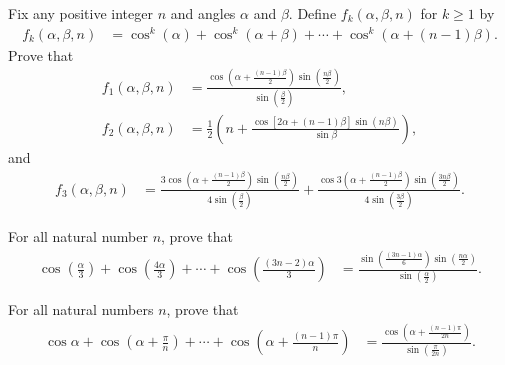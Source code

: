 \begin{tcolorbox}[title={Sum of Powers of Cosine of Angles Forming an AP}]
    \begin{question}
        Fix any positive integer $n$ and angles $\alpha$ and $\beta$. Define $f_k(\alpha,\beta, n)$ for $k\geq 1$ by
        \begin{align*}
            f_k(\alpha, \beta, n) &= \cos^k(\alpha) + \cos^k(\alpha+\beta) + \cdots + \cos^k(\alpha+(n-1)\beta).
        \end{align*}
        Prove that
        \begin{align*}
            f_1(\alpha, \beta, n) &= \frac{\displaystyle\cos\left(\alpha+\frac{(n-1)\beta}{2}\right)\sin\left(\frac{n\beta}{2}\right)}{\displaystyle\sin\left(\frac{\beta}{2}\right)},\\
            f_2(\alpha, \beta, n) &= \frac{1}{2}\left(n + \frac{\cos[2\alpha+(n-1)\beta]\sin(n\beta)}{\sin \beta}\right),
        \end{align*}
        and
        \begin{align*}
            f_3(\alpha, \beta, n) &= \frac{\displaystyle 3\cos\left(\alpha+\frac{(n-1)\beta}{2}\right)\sin\left(\frac{n\beta}{2}\right)}{\displaystyle 4\sin\left(\frac{\beta}{2}\right)}+\frac{\displaystyle \cos 3\left(\alpha+\frac{(n-1)\beta}{2}\right)\sin\left(\frac{3n\beta}{2}\right)}{\displaystyle 4\sin\left(\frac{3\beta}{2}\right)}.
        \end{align*}
    \end{question}
\end{tcolorbox}



\begin{question}
For all natural number $n$, prove that
    \begin{align*}
        \cos\left(\frac{\alpha}{3}\right) + \cos\left(\frac{4\alpha}{3}\right)  + \cdots + \cos\left(\frac{(3n-2)\alpha}{3}\right) &= \frac{\displaystyle\sin\left(\frac{(3n-1)\alpha}{6}\right)\sin\left(\frac{n\alpha}{2}\right)}{\displaystyle\sin\left(\frac{\alpha}{2}\right)}.
    \end{align*}
\end{question}


\begin{question}
For all natural numbers $n$, prove that
\begin{align*}
        \cos \alpha + \cos\left(\alpha+\frac{\pi}{n}\right)   + \cdots + \cos\left(\alpha+\frac{(n-1)\pi}{n}\right) &=      \frac{\displaystyle\cos\left(\alpha+\frac{(n-1)\pi}{2n}\right)}{\displaystyle\sin\left(\frac{\pi}{2n}\right)}.
    \end{align*}
\end{question}


